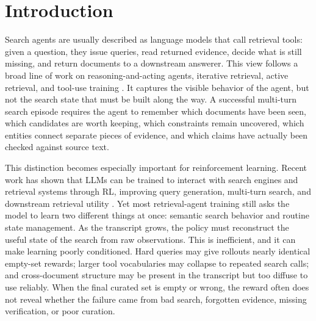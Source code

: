 \documentclass{article}
\newcommand{\sys}{\texttt{Harness-1}\xspace}
\begin{document}

\section{Introduction}
\label{sec:intro}

Search agents are usually described as language models that call retrieval
tools: given a question, they issue queries, read returned evidence, decide what
is still missing, and return documents to a downstream answerer. This view
follows a broad line of work on reasoning-and-acting agents, iterative
retrieval, active retrieval, and tool-use training
\citep{yao2023react,trivedi2023interleaving,jiang2023active,qin2023toolllm,jiang2026adaptationagenticaisurvey}.
It captures the visible behavior of the agent, but not the search state that
must be built along the way. A successful multi-turn search episode requires
the agent to remember which documents have been seen, which candidates are worth
keeping, which constraints remain uncovered, which entities connect separate
pieces of evidence, and which claims have actually been checked against source
text.

This distinction becomes especially important for reinforcement learning.
Recent work has shown that LLMs can be trained to interact with search engines
and retrieval systems through RL, improving query generation, multi-turn search,
and downstream retrieval utility
\citep{jiang2025deepretrieval,jin2025searchr1,jiang2025s3,wang2025stepsearch}. Yet most
retrieval-agent training still asks the model to learn two different things at
once: semantic search behavior and routine state management. As the transcript
grows, the policy must reconstruct the useful state of the search from raw
observations. This is inefficient, and it can make learning poorly conditioned.
Hard queries may give rollouts nearly identical empty-set rewards; larger tool
vocabularies may collapse to repeated search calls; and cross-document
structure may be present in the transcript but too diffuse to use reliably. When the final curated set is empty or wrong, the reward often does not reveal
whether the failure came from bad search, forgotten evidence, missing
verification, or poor curation.
\end{document}
